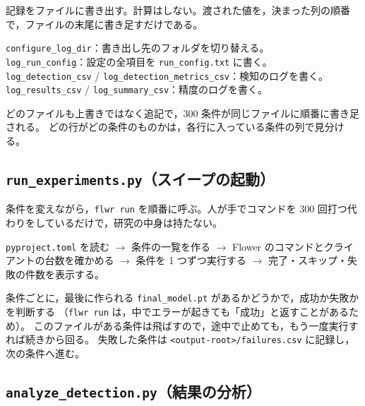 \documentclass[a4j, dvipdfmx]{jsarticle}  %
\begin{document}
\begin{description}[leftmargin=1.4em, style=nextline]
  \item[役割] 記録をファイルに書き出す。計算はしない。渡された値を，決まった列の順番で，ファイルの末尾に書き足すだけである。
  \item[主な関数]
        \texttt{configure\_log\_dir}：書き出し先のフォルダを切り替える。\\
        \texttt{log\_run\_config}：設定の全項目を \texttt{run\_config.txt} に書く。\\
        \texttt{log\_detection\_csv} / \texttt{log\_detection\_metrics\_csv}：検知のログを書く。\\
        \texttt{log\_results\_csv} / \texttt{log\_summary\_csv}：精度のログを書く。
  \item[要点] どのファイルも上書きではなく追記で，300 条件が同じファイルに順番に書き足される。
        どの行がどの条件のものかは，各行に入っている条件の列で見分ける。
\end{description}

\subsection{\texttt{run\_experiments.py}（スイープの起動）}

\begin{description}[leftmargin=1.4em, style=nextline]
  \item[役割] 条件を変えながら，\texttt{flwr run} を順番に呼ぶ。人が手でコマンドを 300 回打つ代わりをしているだけで，研究の中身は持たない。
  \item[流れ]
        \texttt{pyproject.toml} を読む $\rightarrow$ 条件の一覧を作る $\rightarrow$ Flower のコマンドとクライアントの台数を確かめる $\rightarrow$
        条件を 1 つずつ実行する $\rightarrow$ 完了・スキップ・失敗の件数を表示する。
  \item[要点] 条件ごとに，最後に作られる \texttt{final\_model.pt} があるかどうかで，成功か失敗かを判断する
        （\texttt{flwr run} は，中でエラーが起きても「成功」と返すことがあるため）。
        このファイルがある条件は飛ばすので，途中で止めても，もう一度実行すれば続きから回る。
        失敗した条件は \texttt{<output-root>/failures.csv} に記録し，次の条件へ進む。
\end{description}

\subsection{\texttt{analyze\_detection.py}（結果の分析）}
\end{document}
